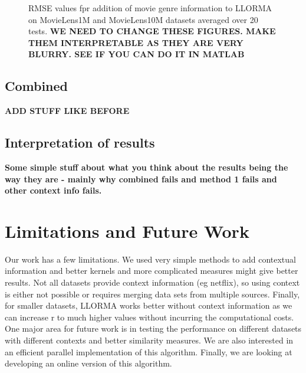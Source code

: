 \documentclass[10 pt,table]{article}  %
\begin{document}
\begin{figure}[t!]
\centering
\caption{\small RMSE values fpr addition of movie genre information to LLORMA on MovieLens1M and MovieLens10M datasets averaged over 20 tests. \bf WE NEED TO CHANGE THESE FIGURES. MAKE THEM INTERPRETABLE AS THEY ARE VERY BLURRY. SEE IF YOU CAN DO IT IN MATLAB}
\label{fig:TCH_2DTraj1}\vspace{-4mm}
\end{figure}


\subsection{Combined}
\textbf{ADD STUFF LIKE BEFORE}

\subsection{Interpretation of results}
\textbf{Some simple stuff about what you think about the results being the way they are - mainly why combined fails and method 1 fails and other context info fails.}

\section{Limitations and Future Work}
Our work has a few limitations. We used very simple methods to add contextual information and better kernels and more complicated measures might give better results. Not all datasets provide context information (eg netflix), so using context is either not possible or requires merging data sets from multiple sources. Finally, for smaller datasets, LLORMA works better without context information as we can increase r to much higher values without incurring the computational costs. One major area for future work is in testing the performance on different datasets with different contexts and better similarity measures. We are also interested in an efficient parallel implementation of this algorithm. Finally, we are looking at developing an online version of this algorithm.
\end{document}
